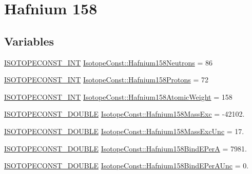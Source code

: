 \hypertarget{group___isotope_const-_hafnium-_hf158}{}\section{Hafnium 158}
\label{group___isotope_const-_hafnium-_hf158}
\subsection*{Variables}
\begin{DoxyCompactItemize}
\item 
\mbox{\hyperlink{group___isotope_const-_macros_ga5f18360b3e99483a35c32d789e62621c}{I\+S\+O\+T\+O\+P\+E\+C\+O\+N\+S\+T\+\_\+\+I\+NT}} \mbox{\hyperlink{group___isotope_const-_hafnium-_hf158_ga9b5b29c68dfbc0a3d64185fb1d9c055d}{Isotope\+Const\+::\+Hafnium158\+Neutrons}} = 86
\item 
\mbox{\hyperlink{group___isotope_const-_macros_ga5f18360b3e99483a35c32d789e62621c}{I\+S\+O\+T\+O\+P\+E\+C\+O\+N\+S\+T\+\_\+\+I\+NT}} \mbox{\hyperlink{group___isotope_const-_hafnium-_hf158_ga5ad26ee86c44a0895b4e6745835431a5}{Isotope\+Const\+::\+Hafnium158\+Protons}} = 72
\item 
\mbox{\hyperlink{group___isotope_const-_macros_ga5f18360b3e99483a35c32d789e62621c}{I\+S\+O\+T\+O\+P\+E\+C\+O\+N\+S\+T\+\_\+\+I\+NT}} \mbox{\hyperlink{group___isotope_const-_hafnium-_hf158_ga2e7a10797df4c5039298e4a75aad019f}{Isotope\+Const\+::\+Hafnium158\+Atomic\+Weight}} = 158
\item 
\mbox{\hyperlink{group___isotope_const-_macros_ga8f45a7272ce02c0b4c65c44636ed719a}{I\+S\+O\+T\+O\+P\+E\+C\+O\+N\+S\+T\+\_\+\+D\+O\+U\+B\+LE}} \mbox{\hyperlink{group___isotope_const-_hafnium-_hf158_ga444b6925e94d24917b6e8ca0b98d11f5}{Isotope\+Const\+::\+Hafnium158\+Mass\+Exc}} = -\/42102.
\item 
\mbox{\hyperlink{group___isotope_const-_macros_ga8f45a7272ce02c0b4c65c44636ed719a}{I\+S\+O\+T\+O\+P\+E\+C\+O\+N\+S\+T\+\_\+\+D\+O\+U\+B\+LE}} \mbox{\hyperlink{group___isotope_const-_hafnium-_hf158_gad326deb8220683e790e4e8d2a3f60696}{Isotope\+Const\+::\+Hafnium158\+Mass\+Exc\+Unc}} = 17.
\item 
\mbox{\hyperlink{group___isotope_const-_macros_ga8f45a7272ce02c0b4c65c44636ed719a}{I\+S\+O\+T\+O\+P\+E\+C\+O\+N\+S\+T\+\_\+\+D\+O\+U\+B\+LE}} \mbox{\hyperlink{group___isotope_const-_hafnium-_hf158_ga7f889bc4a7c8d419b7e62f8a225019fa}{Isotope\+Const\+::\+Hafnium158\+Bind\+E\+PerA}} = 7981.
\item 
\mbox{\hyperlink{group___isotope_const-_macros_ga8f45a7272ce02c0b4c65c44636ed719a}{I\+S\+O\+T\+O\+P\+E\+C\+O\+N\+S\+T\+\_\+\+D\+O\+U\+B\+LE}} \mbox{\hyperlink{group___isotope_const-_hafnium-_hf158_gac331d772811bc5dc4426eeb892d7b138}{Isotope\+Const\+::\+Hafnium158\+Bind\+E\+Per\+A\+Unc}} = 0.

\end{DoxyCompactItemize}
